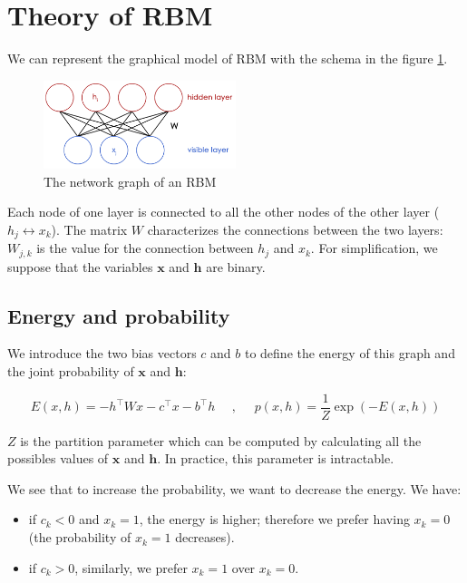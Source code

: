 \documentclass{article}
\begin{document}

\section{Theory of RBM}

We can represent the graphical model of RBM with the schema in the figure \ref{fig:RBM}. 

\begin{figure}
\centering
\includegraphics[width=0.5\textwidth]{rbm.png}
\caption{The network graph of an RBM}
\label{fig:RBM}
\end{figure}

Each node of one layer is connected to all the other nodes of the other layer ($h_j \leftrightarrow x_k$). The matrix $W$ characterizes the connections between the two layers: $ W_{j,k} $ is the value for the connection between $h_j$ and $x_k$. For simplification, we suppose that the variables $ \mathbf{x} $ and $ \mathbf{h} $ are binary.

\subsection{Energy and probability}
\label{subsec:energy}
We introduce the two bias vectors $c$ and $b$ to define the energy of this graph and the joint probability of $ \mathbf{x} $ and $ \mathbf{h} $:

$$ E(x,h) = -h^\top W x - c^\top x - b^\top h ~~~~~~,~~~~~~ p(x,h) = \frac{1}{Z} \exp(-E(x,h)) $$




$Z$ is the partition parameter which can be computed by calculating all the possibles values of $ \mathbf{x} $  and $ \mathbf{h} $. In practice, this parameter is intractable.

We see that to increase the probability, we want to decrease the energy. We have:
 
\begin{itemize}
    \item if $c_k < 0$ and $x_k = 1$, the energy is higher; therefore we prefer having $x_k = 0$ (the probability of $x_k = 1$ decreases).
    \item if $c_k > 0$, similarly, we prefer $x_k = 1$ over $x_k = 0$.
\end{itemize}
\end{document}
